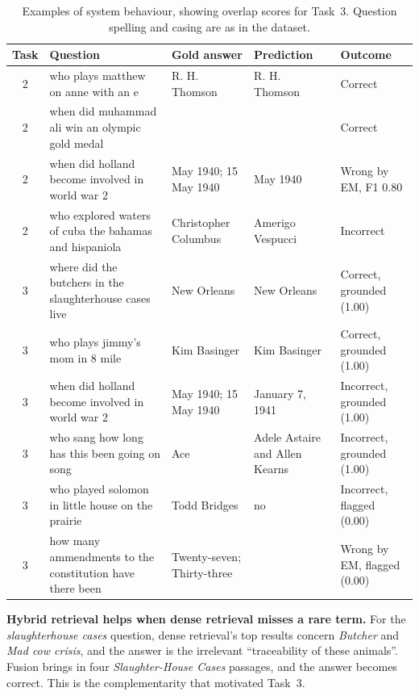 \documentclass[11pt,a4paper]{article}
\begin{document}
\begin{table}[ht]
\centering
\small
\renewcommand{\arraystretch}{1.15}
\begin{tabularx}{\textwidth}{@{}c>{\raggedright\arraybackslash}X>{\raggedright\arraybackslash}p{2.4cm}>{\raggedright\arraybackslash}p{2.6cm}>{\raggedright\arraybackslash}p{2.7cm}@{}}
\toprule
Task & Question & Gold answer & Prediction & Outcome \\
\midrule
2 & who plays matthew on anne with an e & R. H. Thomson & R. H. Thomson & Correct \\
2 & when did muhammad ali win an olympic gold medal & 1960 & 1960 & Correct \\
2 & when did holland become involved in world war 2 & 10 May 1940; 15 May 1940 & May 1940 & Wrong by EM, F1 0.80 \\
2 & who explored waters of cuba the bahamas and hispaniola & Christopher Columbus & Amerigo Vespucci & Incorrect \\
\midrule
3 & where did the butchers in the slaughterhouse cases live & New Orleans & New Orleans & Correct, grounded (1.00) \\
3 & who plays jimmy's mom in 8 mile & Kim Basinger & Kim Basinger & Correct, grounded (1.00) \\
3 & when did holland become involved in world war 2 & 10 May 1940; 15 May 1940 & January 7, 1941 & Incorrect, grounded (1.00) \\
3 & who sang how long has this been going on song & Ace & Adele Astaire and Allen Kearns & Incorrect, grounded (1.00) \\
3 & who played solomon in little house on the prairie & Todd Bridges & no & Incorrect, flagged (0.00) \\
3 & how many ammendments to the constitution have there been & Twenty-seven; Thirty-three & 27 & Wrong by EM, flagged (0.00) \\
\bottomrule
\end{tabularx}
\caption{Examples of system behaviour, showing overlap scores for Task~3. Question spelling and casing are as in the dataset.}
\label{tab:examples}
\end{table}

\textbf{Hybrid retrieval helps when dense retrieval misses a rare term.} For the \emph{slaughterhouse cases} question, dense retrieval's top results concern \emph{Butcher} and \emph{Mad cow crisis}, and the answer is the irrelevant ``traceability of these animals''. Fusion brings in four \emph{Slaughter-House Cases} passages, and the answer becomes correct. This is the complementarity that motivated Task~3.
\end{document}
